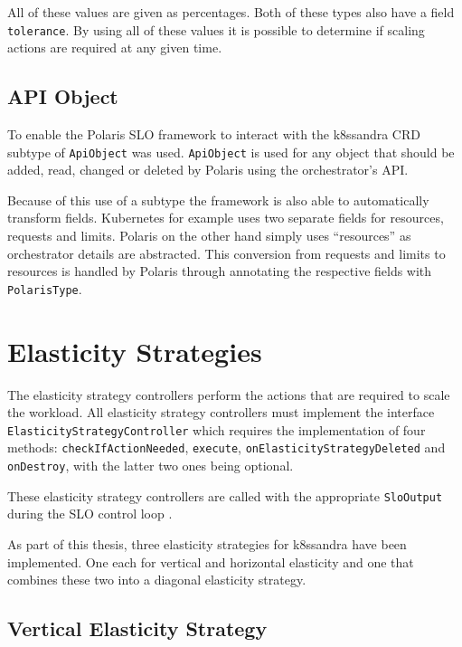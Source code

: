 All of these values are given as percentages. Both of these types also have a field \texttt{tolerance}. By using all of these values it is possible to determine if scaling actions are required at any given time. 

\subsection{API Object}

To enable the Polaris SLO framework to interact with the k8ssandra CRD subtype of \texttt{ApiObject} was used. \texttt{ApiObject} is used for any object that should be added, read, changed or deleted by Polaris using the orchestrator's API.

Because of this use of a subtype the framework is also able to automatically transform fields. Kubernetes for example uses two separate fields for resources, requests and limits. Polaris on the other hand simply uses ``resources'' as orchestrator details are abstracted. This conversion from requests and limits to resources is handled by Polaris through annotating the respective fields with \texttt{PolarisType}.

\section{Elasticity Strategies}


The elasticity strategy controllers perform the actions that are required to scale the workload. All elasticity strategy controllers must implement the interface \texttt{Elasticity\-Strategy\-Controller} which requires the implementation of four methods: \texttt{check\-If\-Action\-Needed}, \texttt{execute}, \texttt{on\-Elasticity\-Strategy\-Deleted} and \texttt{on\-Destroy}, with the latter two ones being optional.

These elasticity strategy controllers are called with the appropriate \texttt{SloOutput} during the SLO control loop \cite{pusztaiNovelMiddlewareEfficiently2021a}.

As part of this thesis, three elasticity strategies for k8ssandra have been implemented. One each for vertical and horizontal elasticity and one that combines these two into a diagonal elasticity strategy.

\subsection{Vertical Elasticity Strategy}
\label{sec:vertical-elasticity}

